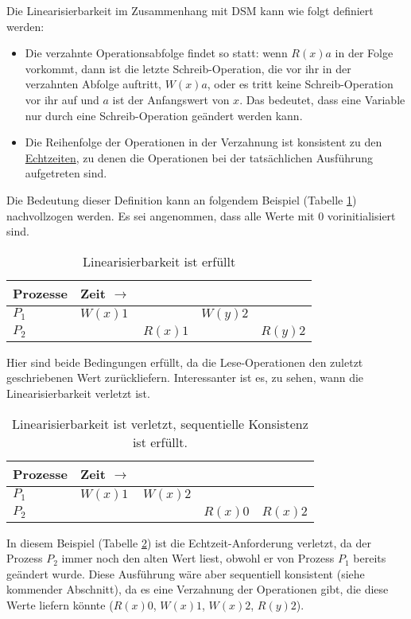 Die Linearisierbarkeit im Zusammenhang mit DSM kann wie folgt definiert werden:
\begin{itemize}
	\item Die verzahnte Operationsabfolge findet so statt: wenn $R(x)a$ in der Folge vorkommt, dann ist die letzte Schreib-Operation, die vor ihr in der verzahnten Abfolge auftritt, $W(x)a$, oder es tritt keine Schreib-Operation vor ihr auf und $a$ ist der Anfangswert von $x$. Das bedeutet, dass eine Variable nur durch eine Schreib-Operation geändert werden kann.
	\item Die Reihenfolge der Operationen in der Verzahnung ist konsistent zu den \underline{Echtzeiten}, zu denen die Operationen bei der tatsächlichen Ausführung aufgetreten sind.
\end{itemize}

Die Bedeutung dieser Definition kann an folgendem Beispiel (Tabelle \ref{tab:1}) nachvollzogen werden. Es sei angenommen, dass alle Werte mit $0$ vorinitialisiert sind.

\begin{table}
	\centering
		\begin{tabular}{l | l l l l}
			\textbf{Prozesse} & \textbf{Zeit} $\rightarrow$ & \\
			\hline
			$P_{1}$ & $W(x)1$ & & $W(y)2$ \\
			$P_{2}$ & & $R(x)1$ & & $R(y)2$ \\
		\end{tabular}
	\caption{Linearisierbarkeit ist erfüllt}
	\label{tab:1}
\end{table}

Hier sind beide Bedingungen erfüllt, da die Lese-Operationen den zuletzt geschriebenen Wert zurückliefern. Interessanter ist es, zu sehen, wann die Linearisierbarkeit verletzt ist.

\begin{table}
	\centering
		\begin{tabular}{l | l l l l}
		\textbf{Prozesse} & \textbf{Zeit} $\rightarrow$ \\
		\hline
		$P_{1}$ & $W(x)1$ & $W(x)2$ \\
		$P_{2}$ & & & \color{red} $R(x)0$ & \color{black} $R(x)2$ \\
		\end{tabular}
	\caption{Linearisierbarkeit ist verletzt, sequentielle Konsistenz ist erfüllt.}
	\label{tab:2}
\end{table}

In diesem Beispiel (Tabelle \ref{tab:2}) ist die Echtzeit-Anforderung verletzt, da der Prozess $P_{2}$ immer noch den alten Wert liest, obwohl er von Prozess $P_{1}$ bereits geändert wurde. Diese Ausführung wäre aber sequentiell konsistent (siehe kommender Abschnitt), da es eine Verzahnung der Operationen gibt, die diese Werte liefern könnte ($R(x)0$, $W(x)1$, $W(x)2$, $R(y)2$). 